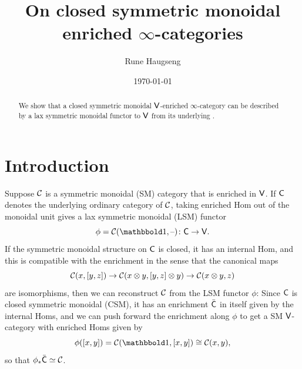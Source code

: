 \documentclass[a4paper,11pt]{article}
\title{On closed symmetric monoidal enriched $\infty$-categories}
\author{Rune Haugseng}
\date{\today}
\newcommand{\SM}{SM}
\newcommand{\LSM}{LSM}
\begin{document}
\maketitle

\begin{abstract}
  We show that a closed symmetric monoidal $\textup{\textsf{V}}$-enriched
  $\infty$-category can be described by a lax symmetric monoidal
  functor to $\textup{\textsf{V}}$ from its underlying \icat{}.
\end{abstract}

\tableofcontents

\section{Introduction}
Suppose $\mathcal{C}$ is a symmetric monoidal (SM) category that is enriched in
$\textup{\textsf{V}}$. If $\textup{\textsf{C}}$ denotes the underlying ordinary category of $\mathcal{C}$,
taking enriched Hom out of the monoidal unit gives a lax symmetric
monoidal (LSM) functor
\[ \phi = \eC(\bbone,\blank) \colon \oC \to \oV.\]
If the symmetric monoidal structure on $\textup{\textsf{C}}$ is closed, \ie{} it has
an internal Hom, and this is compatible with the enrichment in the
sense that the canonical maps
\[ \eC(x, [y,z]) \to \eC(x \otimes y, [y,z] \otimes y) \to \eC(x
  \otimes y, z)\]
are isomorphisms, then we can reconstruct $\mathcal{C}$ from the \LSM{} functor $\phi$: Since $\textup{\textsf{C}}$ is closed symmetric
monoidal (CSM), it has an enrichment $\bar{\textup{\textsf{C}}}$ in itself given by
the internal Homs, and we can push
forward the enrichment along $\phi$  to get a \SM{}
$\textup{\textsf{V}}$-category with enriched Homs given by
\[ \phi([x,y]) = \eC(\bbone,[x,y]) \cong \eC(x,y),\]
so that $\phi_{*}\bar{\textup{\textsf{C}}} \simeq \mathcal{C}$.
\end{document}

